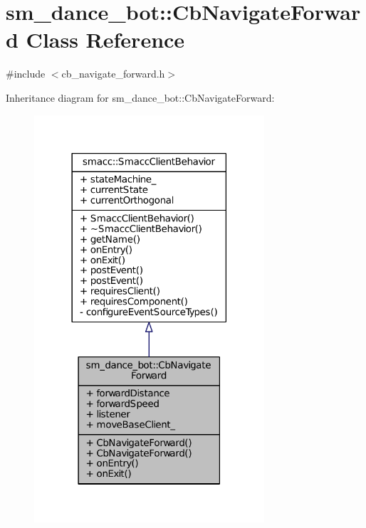 \hypertarget{classsm__dance__bot_1_1CbNavigateForward}{}\section{sm\+\_\+dance\+\_\+bot\+:\+:Cb\+Navigate\+Forward Class Reference}
\label{classsm__dance__bot_1_1CbNavigateForward}


{\ttfamily \#include $<$cb\+\_\+navigate\+\_\+forward.\+h$>$}



Inheritance diagram for sm\+\_\+dance\+\_\+bot\+:\+:Cb\+Navigate\+Forward\+:
\nopagebreak
\begin{figure}[H]
\begin{center}
\leavevmode
\includegraphics[width=242pt]{classsm__dance__bot_1_1CbNavigateForward__inherit__graph}
\end{center}
\end{figure}


